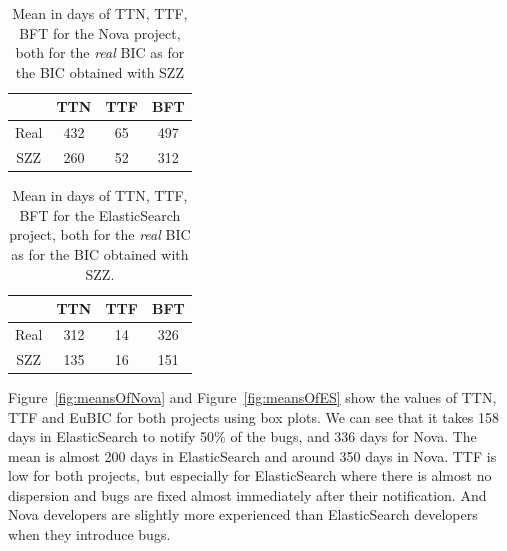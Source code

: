 \documentclass[10pt, conference]{IEEEtran}
\begin{document}
\begin{table}[!t]
\renewcommand{\arraystretch}{1.3}
\centering
\caption{Mean in days of TTN, TTF, BFT for the Nova project, both for the \emph{real} BIC as for the BIC obtained with SZZ}
\label{tableNova}
\begin{tabular}{|c||c||c||c| }
\hline
  & TTN & TTF & BFT \\
\hline
Real & 432 & 65 & 497 \\
\hline
SZZ & 260 & 52 & 312\\
\hline
\end{tabular}
\end{table}

\begin{table}[!t]
\renewcommand{\arraystretch}{1.3}
\centering
\caption{Mean in days of TTN, TTF, BFT for the ElasticSearch project, both for the \emph{real} BIC as for the BIC obtained with SZZ.}
\label{tableES}
\begin{tabular}{|c||c||c||c| }
\hline
  & TTN & TTF & BFT \\
\hline
Real & 312 & 14 & 326 \\
\hline
SZZ & 135 & 16 & 151\\
\hline
\end{tabular}
\end{table}

Figure~\ref{fig:meansOfNova} and Figure~\ref{fig:meansOfES} show the values of TTN, TTF and EuBIC for both projects using box plots. We can see that it takes 158 days in ElasticSearch to notify 50\% of the bugs, and 336 days for Nova. The mean is almost 200 days in ElasticSearch and around 350 days in Nova. TTF is low for both projects, but especially for ElasticSearch where there is almost no dispersion and bugs are fixed almost immediately after their notification. And Nova developers are slightly more experienced than ElasticSearch developers when they introduce bugs.
\end{document}
